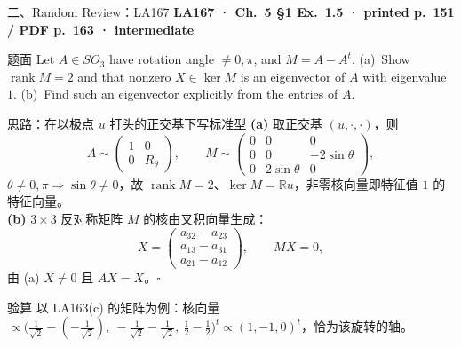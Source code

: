 \documentclass[aspectratio=169,10pt,fontset=none]{ctexbeamer}
\newcommand{\ex}[1]{\textcolor{accent}{\footnotesize\bfseries #1}}
\begin{document}
\begin{frame}[t]{二、Random Review：LA167}
  \leavevmode\ex{LA167 · Ch.~5 §1 Ex.~1.5 · printed p.~151 / PDF p.~163 · intermediate}
  \begin{block}{\footnotesize 题面}
    \scriptsize Let $A\in SO_3$ have rotation angle $\ne0,\pi$, and $M=A-A^t$. (a)~Show $\operatorname{rank}M=2$ and that nonzero $X\in\ker M$ is an eigenvector of $A$ with eigenvalue $1$. (b)~Find such an eigenvector explicitly from the entries of $A$.
  \end{block}
  \begin{exampleblock}{\footnotesize 思路：在以极点 $u$ 打头的正交基下写标准型}
    \scriptsize
    \textbf{(a)} 取正交基 $(u,\cdot,\cdot)$，则
    $$A\sim\begin{pmatrix}1&0\\0&R_\theta\end{pmatrix},\qquad M\sim\begin{pmatrix}0&0&0\\0&0&-2\sin\theta\\0&2\sin\theta&0\end{pmatrix},$$
    $\theta\ne0,\pi\Rightarrow\sin\theta\ne0$，故 $\operatorname{rank}M=2$、$\ker M=\mathbb Ru$，非零核向量即特征值 $1$ 的特征向量。\\[2pt]
    \textbf{(b)} $3\times3$ 反对称矩阵 $M$ 的核由叉积向量生成：
    $$X=\begin{pmatrix}a_{32}-a_{23}\\ a_{13}-a_{31}\\ a_{21}-a_{12}\end{pmatrix},\qquad MX=0,$$
    由 (a) $X\ne0$ 且 $AX=X$。$\square$
  \end{exampleblock}
  \begin{block}{\footnotesize 验算}
    \scriptsize 以 LA163(c) 的矩阵为例：核向量 $\propto\bigl(\tfrac1{\sqrt2}-(-\tfrac1{\sqrt2}),\ -\tfrac1{\sqrt2}-\tfrac1{\sqrt2},\ \tfrac12-\tfrac12\bigr)^t\propto(1,-1,0)^t$，恰为该旋转的轴。
  \end{block}
\end{frame}
\end{document}
